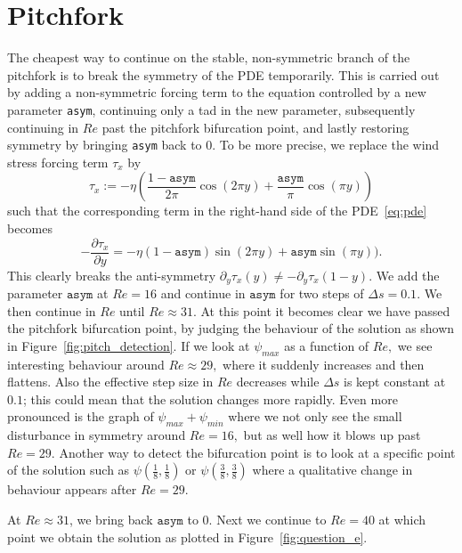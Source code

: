 \section{Pitchfork}


The cheapest way to continue on the stable, non-symmetric branch of the pitchfork is to break the symmetry of the PDE temporarily. This is carried out by adding a non-symmetric forcing term to the equation controlled by a new parameter {\tt asym}, continuing only a tad in the new parameter, subsequently continuing in $Re$ past the pitchfork bifurcation point, and lastly restoring symmetry by bringing {\tt asym} back to 0. To be more precise, we replace the wind stress forcing term $\tau_x$ by
\begin{equation}
    \tau_x := -\eta \left( \frac{1 - \mathtt{asym}}{2 \pi} \cos(2\pi y) + \frac{\mathtt{asym}}{\pi} \cos(\pi y) \right)
\end{equation}
such that the corresponding term in the right-hand side of the PDE~\eqref{eq:pde} becomes
\begin{equation}
    -\frac{\partial \tau_x}{\partial y} = -\eta (1 - \mathtt{asym})\sin(2\pi y) + \mathtt{asym}\sin(\pi y)).
\end{equation}
This clearly breaks the anti-symmetry $\partial_y \tau_x(y) \neq -\partial_y \tau_x(1 - y).$ We add the parameter $\mathtt{asym}$ at $Re = 16$ and continue in $\mathtt{asym}$ for two steps of $\Delta s = 0.1.$ We then continue in $Re$ until $Re \approx 31.$ At this point it becomes clear we have passed the pitchfork bifurcation point, by judging the behaviour of the solution as shown in Figure~\ref{fig:pitch_detection}. If we look at $\psi_{max}$ as a function of $Re,$ we see interesting behaviour around $Re \approx 29,$ where it suddenly increases and then flattens. Also the effective step size in $Re$ decreases while $\Delta s$ is kept constant at $0.1$; this could mean that the solution changes more rapidly. Even more pronounced is the graph of $\psi_{max} + \psi_{min}$ where we not only see the small disturbance in symmetry around $Re = 16,$ but as well how it blows up past $Re = 29.$ Another way to detect the bifurcation point is to look at a specific point of the solution such as $\psi(\tfrac{1}{8}, \tfrac{1}{8})$ or $\psi(\tfrac{3}{8}, \tfrac{3}{8})$ where a qualitative change in behaviour appears after $Re = 29.$

At $Re \approx 31$, we bring back $\texttt{asym}$ to $0.$ Next we continue to $Re = 40$ at which point we obtain the solution as plotted in Figure~\ref{fig:question_e}.

